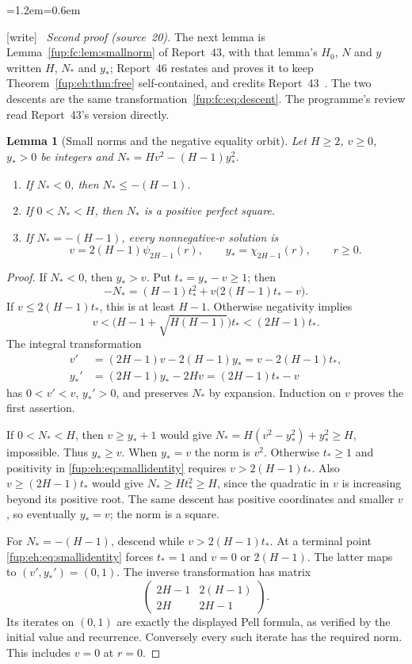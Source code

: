\documentclass[11pt,letterpaper]{article}
\newtheorem{lemma}[theorem]{Lemma}
\theoremstyle{definition}\newtheorem{definition}[theorem]{Definition}
\theoremstyle{remark}\newtheorem{remark}[theorem]{Remark}
\newcommand{\wtag}{\textup{[write]}}
\newenvironment{writenote}{\par\smallskip\begin{list}{}{\leftmargin=1.2em\rightmargin=0.6em}\item[]\small\wtag\ }{\end{list}\smallskip}
\begin{document}
\begin{writenote}
\emph{Second proof (source~20).} The next lemma is Lemma~\ref{fup:fc:lem:smallnorm} of Report~43, with that lemma's $H_0$, $N$ and $y$ written $H$, $N_*$ and $y_*$; Report~46 restates and proves it to keep Theorem~\ref{fup:eh:thm:free} self-contained, and credits Report~43~\cite{fup:eh:smallnorm}. The two descents are the same transformation~\eqref{fup:fc:eq:descent}. The programme's review read Report~43's version directly.
\end{writenote}
\begin{lemma}[Small norms and the negative equality orbit]
\label{fup:eh:lem:smallnorm}
Let $H\ge2$, $v\ge0$, $y_*>0$ be integers and
$N_*=Hv^2-(H-1)y_*^2$.
\begin{enumerate}
\item If $N_*<0$, then $N_*\le-(H-1)$.
\item If $0<N_*<H$, then $N_*$ is a positive perfect square.
\item If $N_*=-(H-1)$, every nonnegative-$v$ solution is
\[
 v=2(H-1)\psi_{2H-1}(r),\qquad y_*=\chi_{2H-1}(r),\qquad r\ge0.
\]
\end{enumerate}
\end{lemma}
\begin{proof}
If $N_*<0$, then $y_*>v$. Put $t_*=y_*-v\ge1$; then
\begin{equation}\label{fup:eh:eq:smallidentity}
 -N_*=(H-1)t_*^2+v\bigl(2(H-1)t_*-v\bigr).
\end{equation}
If $v\le2(H-1)t_*$, this is at least $H-1$. Otherwise negativity
implies
\[
 v<\bigl(H-1+\sqrt{H(H-1)}\bigr)t_*<(2H-1)t_*.
\]
The integral transformation
\begin{align*}
 v'&=(2H-1)v-2(H-1)y_*=v-2(H-1)t_*,\\
 y_*'&=(2H-1)y_*-2Hv=(2H-1)t_*-v
\end{align*}
has $0<v'<v$, $y_*'>0$, and preserves $N_*$ by expansion.
Induction on $v$ proves the first assertion.

If $0<N_*<H$, then $v\ge y_*+1$ would give
$N_*=H(v^2-y_*^2)+y_*^2\ge H$, impossible. Thus $y_*\ge v$.
When $y_*=v$ the norm is $v^2$. Otherwise $t_*\ge1$ and
positivity in \eqref{fup:eh:eq:smallidentity} requires
$v>2(H-1)t_*$. Also $v\ge(2H-1)t_*$ would give
$N_*\ge Ht_*^2\ge H$, since the quadratic in $v$ is increasing
beyond its positive root. The same descent has positive coordinates
and smaller $v$, so eventually $y_*=v$; the norm is a square.

For $N_*=-(H-1)$, descend while $v>2(H-1)t_*$.
At a terminal point \eqref{fup:eh:eq:smallidentity} forces $t_*=1$ and
$v=0$ or $2(H-1)$. The latter maps to $(v',y_*')=(0,1)$.
The inverse transformation has matrix
\[
 \begin{pmatrix}2H-1&2(H-1)\\2H&2H-1\end{pmatrix}.
\]
Its iterates on $(0,1)$ are exactly the displayed Pell formula,
as verified by the initial value and recurrence. Conversely every such
iterate has the required norm. This includes $v=0$ at $r=0$.
\end{proof}
\end{document}
